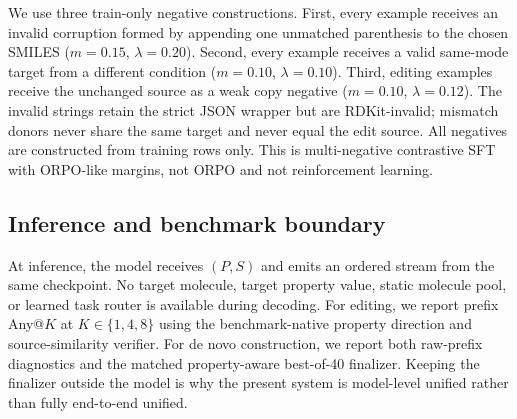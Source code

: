 We use three train-only negative constructions. First, every example receives
an invalid corruption formed by appending one unmatched parenthesis to the
chosen SMILES ($m=0.15$, $\lambda=0.20$). Second, every example receives a
valid same-mode target from a different condition ($m=0.10$,
$\lambda=0.10$). Third, editing examples receive the unchanged source as a
weak copy negative ($m=0.10$, $\lambda=0.12$). The invalid strings retain the
strict JSON wrapper but are RDKit-invalid; mismatch donors never share the
same target and never equal the edit source. All negatives are constructed
from training rows only. This is multi-negative contrastive SFT with
ORPO-like margins, not ORPO and not reinforcement learning.

\subsection{Inference and benchmark boundary}
At inference, the model receives $(P,S)$ and emits an ordered stream from the
same checkpoint. No target molecule, target property value, static molecule
pool, or learned task router is available during decoding. For editing, we
report prefix Any@$K$ at $K\in\{1,4,8\}$ using the benchmark-native property
direction and source-similarity verifier. For de novo construction, we report
both raw-prefix diagnostics and the matched property-aware best-of-40
finalizer. Keeping the finalizer outside the model is why the present system
is model-level unified rather than fully end-to-end unified.

